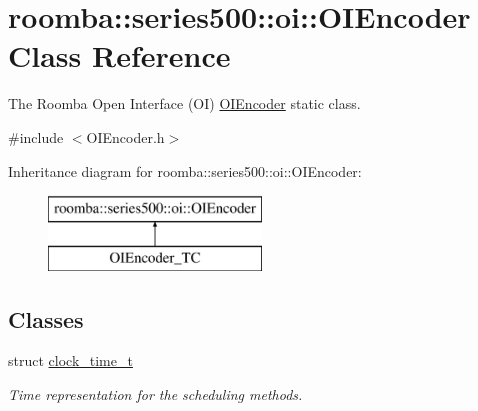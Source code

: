 \hypertarget{classroomba_1_1series500_1_1oi_1_1_o_i_encoder}{\section{roomba\+:\+:series500\+:\+:oi\+:\+:O\+I\+Encoder Class Reference}
\label{classroomba_1_1series500_1_1oi_1_1_o_i_encoder}
}


The Roomba Open Interface (O\+I) \hyperlink{classroomba_1_1series500_1_1oi_1_1_o_i_encoder}{O\+I\+Encoder} static class.  




{\ttfamily \#include $<$O\+I\+Encoder.\+h$>$}

Inheritance diagram for roomba\+:\+:series500\+:\+:oi\+:\+:O\+I\+Encoder\+:\begin{figure}[H]
\begin{center}
\leavevmode
\includegraphics[height=2.000000cm]{classroomba_1_1series500_1_1oi_1_1_o_i_encoder}
\end{center}
\end{figure}
\subsection*{Classes}
\begin{DoxyCompactItemize}
\item 
struct \hyperlink{structroomba_1_1series500_1_1oi_1_1_o_i_encoder_1_1clock__time__t}{clock\+\_\+time\+\_\+t}
\begin{DoxyCompactList}\small\item\em Time representation for the scheduling methods. \end{DoxyCompactList}\end{DoxyCompactItemize}

